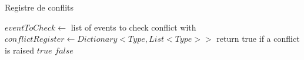 \begin{algorithm} %
	\caption{Registre de conflits} %
	\label{algo:conflictregister} %
	\begin{algorithmic} %
		
		\Require $eventToCheck \leftarrow$ list of events to check conflict with\\
		$conflictRegister \leftarrow  Dictionary<Type, List<Type>>$
		\Ensure return true if a conflict is raised
		\State \Return $true$
		\EndIf
		\EndFor
		\EndIf
		\State \Return $false$
		\EndFunction
	\end{algorithmic}
	
\end{algorithm}


%
%


